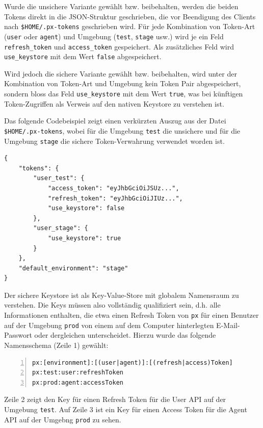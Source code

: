 Wurde die unsichere Variante gewählt bzw. beibehalten, werden die beiden Tokens direkt in die JSON-Struktur geschrieben, die vor Beendigung des Clients nach \texttt{\$HOME/.px-tokens} geschrieben wird. Für jede Kombination von Token-Art (\texttt{user} oder \texttt{agent}) und Umgebung (\texttt{test}, \texttt{stage} usw.) wird je ein Feld \texttt{refresh\_token} und \texttt{access\_token} gespeichert. Als zusätzliches Feld wird \texttt{use\_keystore} mit dem Wert \texttt{false} abgespeichert.

Wird jedoch die sichere Variante gewählt bzw. beibehalten, wird unter der Kombination von Token-Art und Umgebung kein Token Pair abgespeichert, sondern bloss das Feld \texttt{use\_keystore} mit dem Wert \texttt{true}, was bei künftigen Token-Zugriffen als Verweis auf den nativen Keystore zu verstehen ist.

Das folgende Codebeispiel zeigt einen verkürzten Auszug aus der Datei \texttt{\$HOME/.px-tokens}, wobei für die Umgebung \texttt{test} die unsichere und für die Umgebung \texttt{stage} die sichere Token-Verwahrung verwendet worden ist.

\begin{lstlisting}[caption={Die JSON-Struktur für den Keystore (Auszug)}]
{
	"tokens": {
		"user_test": {
			"access_token": "eyJhbGciOiJSUz...",
			"refresh_token": "eyJhbGciOiJIUz...",
			"use_keystore": false
		},
		"user_stage": {
			"use_keystore": true
		}
	},
	"default_environment": "stage"
}
\end{lstlisting}

Der sichere Keystore ist als Key-Value-Store mit globalem Namensraum zu verstehen. Die Keys müssen also vollständig qualifiziert sein, d.h. alle Informationen enthalten, die etwa einen Refresh Token von \texttt{px} für einen Benutzer auf der Umgebung \texttt{prod} von einem auf dem Computer hinterlegten E-Mail-Passwort oder dergleichen unterscheidet. Hierzu wurde das folgende Namensschema (Zeile 1) gewählt:

\begin{lstlisting}[caption={Namensschema für die Keys auf dem nativen Keystore (mit Beispielen)},numbers=left]
px:[environment]:[(user|agent)]:[(refresh|access)Token]
px:test:user:refreshToken
px:prod:agent:accessToken
\end{lstlisting}

Zeile 2 zeigt den Key für einen Refresh Token für die User API auf der Umgebung \texttt{test}. Auf Zeile 3 ist ein Key für einen Access Token für die Agent API auf der Umgebng \texttt{prod} zu sehen.

